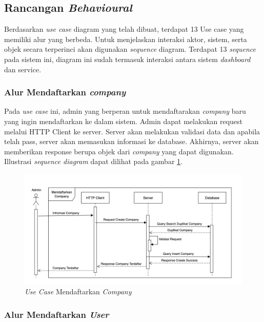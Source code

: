 \subsection{Rancangan \textit{Behavioural}}
\label{subsec:arsitektur-behavioural}

Berdasarkan \textit{use case} diagram yang telah dibuat, terdapat 13 Use case yang memiliki alur yang berbeda. Untuk menjelaskan interaksi aktor, sistem, serta objek secara terperinci akan digunakan \textit{sequence} diagram. Terdapat 13 \textit{sequence} pada sistem ini, diagram ini sudah termasuk interaksi antara sistem \textit{dashboard} dan service.

\subsubsection{Alur Mendaftarkan \textit{company}}

Pada \textit{use case} ini, admin yang berperan untuk mendaftarakan \textit{company} baru yang ingin mendaftarkan ke dalam sistem. Admin dapat melakukan request melalui HTTP Client ke server. Server akan melakukan validasi data dan apabila telah pass, server akan memasukan informasi ke database. Akhirnya, server akan memberikan response berupa objek dari \textit{company} yang dapat digunakan. Illustrasi \textit{sequence diagram} dapat dilihat pada gambar \ref{fig:usecase-01}.

\begin{figure}
  \centering
  \includegraphics[width=1\textwidth]{resources/chapter-3/usecase/uc-01.jpg}
  \caption{\textit{Use Case} Mendaftarkan \textit{Company}}
  \label{fig:usecase-01}
\end{figure}

\pagebreak

\subsubsection{Alur Mendaftarkan \textit{User}}

